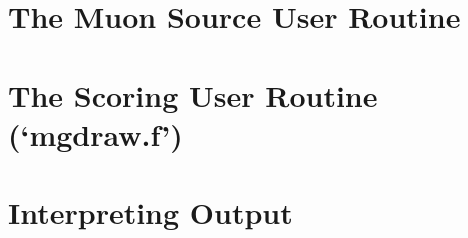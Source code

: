 \documentclass[10pt]{article}
\begin{document}









\part*{The Muon Source User Routine}

\part*{The Scoring User Routine (`mgdraw.f')}

\part*{Interpreting Output}

\clearpage
\appendixheaderon
\appendixpage
\begin{appendices}



\end{appendices}






\end{document}

